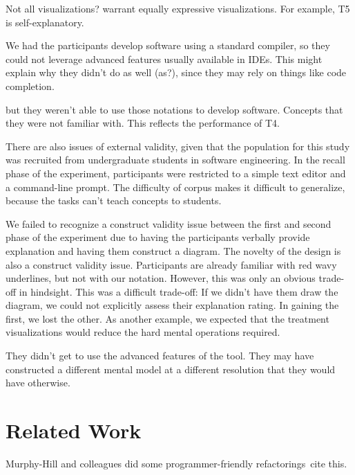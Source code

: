 \documentclass[conference]{IEEEtran}
\begin{document}
Not all visualizations? warrant equally expressive visualizations. For example, T5 is self-explanatory.

We had the participants develop software using a standard compiler, so they could not leverage advanced features usually available in IDEs. This might explain why they didn't do as well (as?), since they may rely on things like code completion.

but they weren't able to use those notations to develop software. Concepts that they were not familiar with. This reflects the performance of T4.

There are also issues of external validity, given that the population for this study was recruited from undergraduate students in software engineering. In the recall phase of the experiment, participants were restricted to a simple text editor and a command-line prompt. The difficulty of corpus makes it difficult to generalize, because the tasks can't teach concepts to students.

We failed to recognize a construct validity issue between the first and second phase of the experiment due to having the participants verbally provide explanation and having them construct a diagram. The novelty of the design is also a construct validity issue. Participants are already familiar with red wavy underlines, but not with our notation. However, this was only an obvious trade-off in hindsight. This was a difficult trade-off: If we didn't have them draw the diagram, we could not explicitly assess their explanation rating. In gaining the first, we lost the other. As another example, we expected that the treatment visualizations would reduce the hard mental operations required.

They didn't get to use the advanced features of the tool. They may have constructed a different mental model at a different resolution that they would have otherwise.

\section{Related Work}

Murphy-Hill and colleagues did some programmer-friendly refactorings~cite this.
\end{document}
